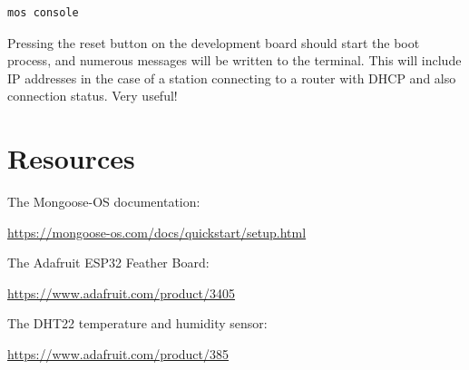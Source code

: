 \documentclass[oneside,letterpaper,12pt]{book}
\begin{document}
\begin{verbatim}
mos console
\end{verbatim}

Pressing the reset button on the development board should start the boot
process, and numerous messages will be written to the terminal. This
will include IP addresses in the case of a station connecting to a
router with DHCP and also connection status. Very useful!

\chapter{Resources}\label{resources}

The Mongoose-OS documentation:

\url{https://mongoose-os.com/docs/quickstart/setup.html}

The Adafruit ESP32 Feather Board:

\url{https://www.adafruit.com/product/3405}

The DHT22 temperature and humidity sensor:

\url{https://www.adafruit.com/product/385}
\end{document}

